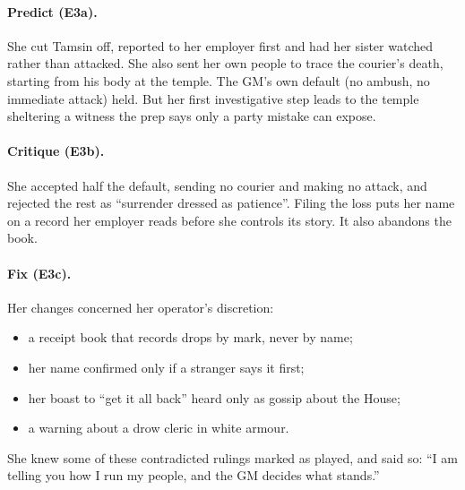 \documentclass[11pt]{article}
\begin{document}
\paragraph{Predict (E3a).} She cut Tamsin off, reported to her employer first and had her
sister watched rather than attacked. She also sent her own people to trace the courier's
death, starting from his body at the temple. The GM's own default (no ambush, no immediate
attack) held. But her first investigative step leads to the temple sheltering a witness the
prep says only a party mistake can expose.

\paragraph{Critique (E3b).} She accepted half the default, sending no courier and making no
attack, and rejected the rest as ``surrender dressed as patience''. Filing the loss puts her
name on a record her employer reads before she controls its story. It also abandons the
book.

\paragraph{Fix (E3c).} Her changes concerned her operator's discretion:
\begin{itemize}[nosep]
\item a receipt book that records drops by mark, never by name;
\item her name confirmed only if a stranger says it first;
\item her boast to ``get it all back'' heard only as gossip about the House;
\item a warning about a drow cleric in white armour.
\end{itemize}
She knew some of these contradicted rulings marked as played, and said so: ``I am telling
you how I run my people, and the GM decides what stands.''
\end{document}
